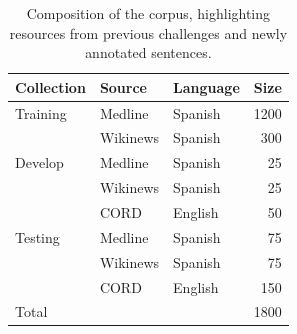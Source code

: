 \documentclass[a4paper,11pt,twocolumn,twoside]{article}
\begin{document}
\begin{table}
  \begin{tabular}{lllr}
    \toprule
    \textbf{Collection} & \textbf{Source} & \textbf{Language} & \textbf{Size} \\
    \midrule
    Training            & Medline         & Spanish           & 1200          \\
                        & Wikinews        & Spanish           & 300           \\
    \midrule
    Develop             & Medline         & Spanish           & 25            \\
                        & Wikinews        & Spanish           & 25            \\
                        & CORD            & English           & 50            \\
    \midrule
    Testing             & Medline         & Spanish           & 75            \\
                        & Wikinews        & Spanish           & 75            \\
                        & CORD            & English           & 150           \\
    \midrule
    Total               &                 &                   & 1800          \\
    \bottomrule
  \end{tabular}
  \caption{Composition of the corpus, highlighting resources from previous
    challenges and newly annotated sentences.\label{tab:corpus}}
\end{table}
\end{document}
